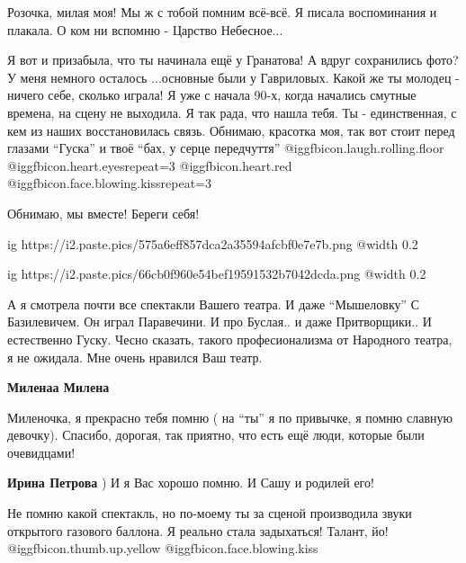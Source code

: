 \begin{itemize}
\begin{itemize} %

Розочка, милая моя! Мы ж с тобой помним всё-всё. Я писала воспоминания и
плакала. О ком ни вспомню - Царство Небесное...

Я вот и призабыла, что ты начинала ещё у Гранатова! А вдруг сохранились фото? У
меня немного осталось ...основные были у Гавриловых. Какой же ты молодец -
ничего себе, сколько играла! Я уже с начала 90-х, когда начались смутные
времена, на сцену не выходила. Я так рада, что нашла тебя. Ты - единственная, с
кем из наших восстановилась связь. Обнимаю, красотка моя, так вот стоит перед
глазами \enquote{Гуска} и твоё \enquote{бах, у серце передчуття}
@igg{fbicon.laugh.rolling.floor}  @igg{fbicon.heart.eyes}{repeat=3}
@igg{fbicon.heart.red} @igg{fbicon.face.blowing.kiss}{repeat=3} 

Обнимаю, мы вместе! Береги себя!

\end{itemize} %


\ifcmt
  ig https://i2.paste.pics/575a6eff857dca2a35594afcbf0e7e7b.png
  @width 0.2
\fi


\ifcmt
  ig https://i2.paste.pics/66cb0f960e54bef19591532b7042dcda.png
  @width 0.2
\fi


А я смотрела почти все спектакли Вашего театра. И даже \enquote{Мышеловку} С
Базилевичем. Он играл Паравечини. И про Буслая.. и даже Притворщики.. И
естественно Гуску. Чесно сказать, такого професионализма от Народного театра, я
не ожидала. Мне очень нравился Ваш театр.

\begin{itemize} %
\textbf{Миленаа Милена} 

Миленочка, я прекрасно тебя помню ( на \enquote{ты} я по привычке, я помню славную
девочку). Спасибо, дорогая, так приятно, что есть ещё люди, которые были
очевидцами!

\textbf{Ирина Петрова} ) И я Вас хорошо помню. И Сашу и родилей его!
\end{itemize} %


Не помню какой спектакль, но по-моему ты за сценой производила звуки открытого
газового баллона. Я реально стала задыхаться! Талант, йо!
@igg{fbicon.thumb.up.yellow}  @igg{fbicon.face.blowing.kiss} 


\end{itemize}
